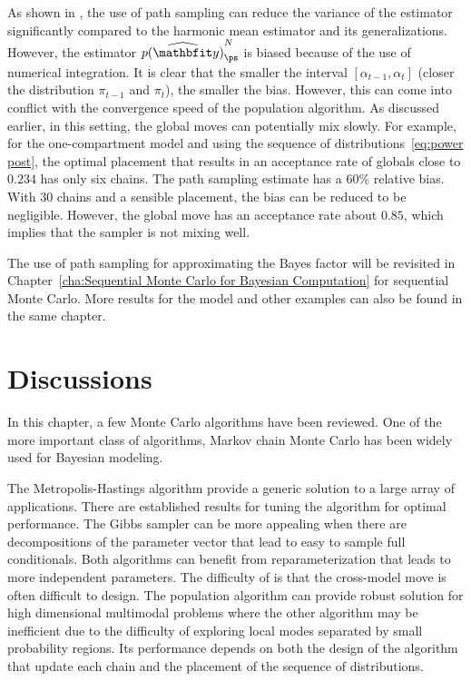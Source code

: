 As shown in \cite{Calderhead:2009bd}, the use of path sampling can reduce the variance of the estimator significantly compared to the harmonic mean estimator and its generalizations. However, the estimator $\widehat{p(\data)}_{\ps}^N$ is biased because of the use of numerical integration. It is clear that the smaller the interval $[\alpha_{t-1},\alpha_t]$ (closer the distribution $\pi_{t-1}$ and $\pi_t$), the smaller the bias. However, this can come into conflict with the convergence speed of the population \mcmc algorithm. As discussed earlier, in this setting, the global moves can potentially mix slowly. For example, for the one-compartment \pet model and using the sequence of distributions~\eqref{eq:power post}, the optimal placement that results in an acceptance rate of globals close to $0.234$ has only six chains. The path sampling estimate has a 60\% relative bias. With 30 chains and a sensible placement, the bias can be reduced to be negligible. However, the global move has an acceptance rate about $0.85$, which implies that the sampler is not mixing well.

The use of path sampling for approximating the Bayes factor will be revisited in Chapter~\ref{cha:Sequential Monte Carlo for Bayesian Computation} for sequential Monte Carlo. More results for the \pet model and other examples can also be found in the same chapter.

\section{Discussions}
\label{sec:Monte Carlo Discussion}

In this chapter, a few Monte Carlo algorithms have been reviewed. One of the more important class of algorithms, Markov chain Monte Carlo has been widely used for Bayesian modeling.

The Metropolis-Hastings algorithm provide a generic solution to a large array of applications. There are established results for tuning the algorithm for optimal performance. The Gibbs sampler can be more appealing when there are decompositions of the parameter vector that lead to easy to sample full conditionals. Both algorithms can benefit from reparameterization that leads to more independent parameters. The difficulty of \rjmcmc is that the cross-model move is often difficult to design. The population \mcmc algorithm can provide robust solution for high dimensional multimodal problems where the other algorithm may be inefficient due to the difficulty of exploring local modes separated by small probability regions. Its performance depends on both the design of the \mcmc algorithm that update each chain and the placement of the sequence of distributions.

